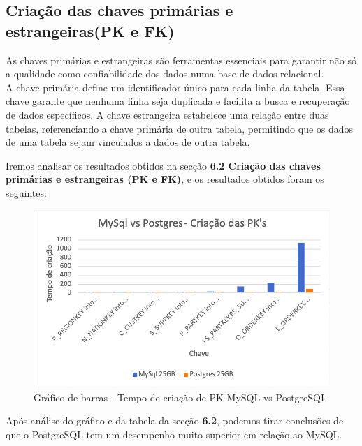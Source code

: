 \documentclass{article}
\begin{document}
\subsection{Criação das chaves primárias e estrangeiras(PK e FK)}

\texttt{}\par As chaves primárias e estrangeiras são ferramentas essenciais para garantir não só a qualidade como confiabilidade dos dados numa base de dados relacional. \\
A chave primária define um identificador único para cada linha da tabela. Essa chave garante que nenhuma linha seja duplicada e facilita a busca e recuperação de dados específicos. A chave estrangeira estabelece uma relação entre duas tabelas, referenciando a chave primária de outra tabela, permitindo que os dados de uma tabela sejam vinculados a dados de outra tabela.\\

\texttt{}\par Iremos analisar os resultados obtidos na secção \textbf{6.2 Criação das chaves primárias e estrangeiras (PK e FK)}, e os resultados obtidos foram os seguintes:

\begin{figure}[H]
  \centering
  \includegraphics[width=\textwidth]{Graphs/PKCreation.png}
  \caption{Gráfico de barras - Tempo de criação de PK MySQL vs PostgreSQL.}
  \label{fig:PKCreation1}
\end{figure}



\texttt{}\par Após análise do gráfico e da tabela da secção \textbf{6.2}, podemos tirar conclusões de que o PostgreSQL tem um desempenho muito superior em relação ao MySQL. \\
\end{document}

